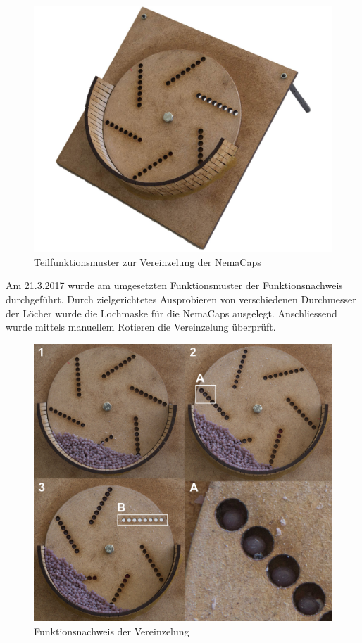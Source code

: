 \begin{figure}[H]
	\includegraphics[width=1\textwidth]{Illustrationen/5-Konzept/funktmuster_vereinzelung_1.jpg}
	\caption{Teilfunktionsmuster zur Vereinzelung der NemaCaps}
	\label{fig:funktmuster_vereinzelung}
\end{figure}
Am 21.3.2017 wurde am umgesetzten Funktionsmuster der Funktionsnachweis durchgeführt. Durch zielgerichtetes Ausprobieren von verschiedenen Durchmesser der Löcher wurde die Lochmaske für die NemaCaps ausgelegt. Anschliessend wurde mittels manuellem Rotieren die Vereinzelung überprüft.
\begin{figure}[H]
	\includegraphics[width=1\textwidth]{Illustrationen/5-Konzept/funktion_vereinzelung.jpg}
	\caption{Funktionsnachweis der Vereinzelung}
	\label{fig:funktion_vereinzelung}
\end{figure}
